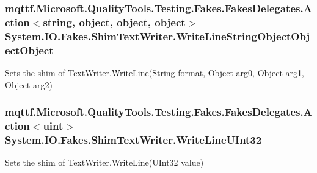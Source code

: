 \hypertarget{class_system_1_1_i_o_1_1_fakes_1_1_shim_text_writer_a8bb3ba14c755a7655f529b7bbeb0e0d0}{
\subsubsection[{Write\-Line\-String\-Object\-Object\-Object}]{\setlength{\rightskip}{0pt plus 5cm}mqttf.\-Microsoft.\-Quality\-Tools.\-Testing.\-Fakes.\-Fakes\-Delegates.\-Action$<$string, object, object, object$>$ System.\-I\-O.\-Fakes.\-Shim\-Text\-Writer.\-Write\-Line\-String\-Object\-Object\-Object\hspace{0.3cm}{\ttfamily [set]}}}\label{class_system_1_1_i_o_1_1_fakes_1_1_shim_text_writer_a8bb3ba14c755a7655f529b7bbeb0e0d0}


Sets the shim of Text\-Writer.\-Write\-Line(\-String format, Object arg0, Object arg1, Object arg2)

\hypertarget{class_system_1_1_i_o_1_1_fakes_1_1_shim_text_writer_a5ed3dcc4431e7c36aa1dbbda9ec0fb79}{
\subsubsection[{Write\-Line\-U\-Int32}]{\setlength{\rightskip}{0pt plus 5cm}mqttf.\-Microsoft.\-Quality\-Tools.\-Testing.\-Fakes.\-Fakes\-Delegates.\-Action$<$uint$>$ System.\-I\-O.\-Fakes.\-Shim\-Text\-Writer.\-Write\-Line\-U\-Int32\hspace{0.3cm}{\ttfamily [set]}}}\label{class_system_1_1_i_o_1_1_fakes_1_1_shim_text_writer_a5ed3dcc4431e7c36aa1dbbda9ec0fb79}


Sets the shim of Text\-Writer.\-Write\-Line(\-U\-Int32 value)

